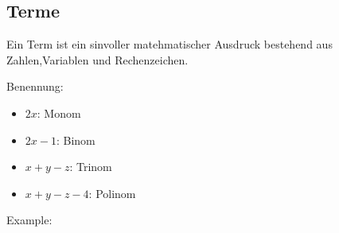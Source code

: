 \newpage
\subsection{Terme}

Ein Term ist ein sinvoller matehmatischer Ausdruck bestehend aus Zahlen,Variablen und Rechenzeichen.

\hfill \break
Benennung:
\begin{itemize}
    \item $2x$: Monom
    \item $2x-1$: Binom
    \item $x+y-z$: Trinom
    \item $x+y-z-4$: Polinom
\end{itemize}

\hfill \break
Example:\\
\fboxrule=0.8pt 
